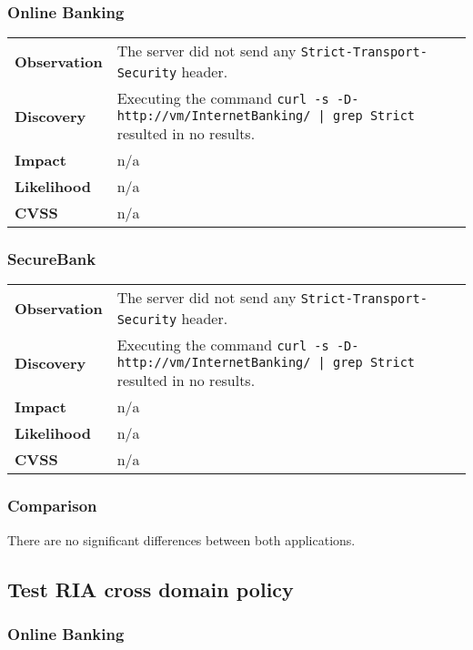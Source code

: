 \subsubsection*{Online Banking}

\begin{tabular}{l|p{10cm}}

\textbf{Observation} & The server did not send any \texttt{Strict-Transport-Security} header.  \\
\textbf{Discovery} & Executing the command \texttt{curl -s -D- http://vm/InternetBanking/ | grep Strict} resulted in no results. \\
\textbf{Impact} & n/a \\
\textbf{Likelihood} & n/a \\
\textbf{CVSS} & n/a \\
\end{tabular}


\subsubsection*{SecureBank}

\begin{tabular}{l|p{10cm}}

\textbf{Observation} & The server did not send any \texttt{Strict-Transport-Security} header.  \\
\textbf{Discovery} & Executing the command \texttt{curl -s -D- http://vm/InternetBanking/ | grep Strict} resulted in no results. \\
\textbf{Impact} & n/a \\
\textbf{Likelihood} & n/a \\
\textbf{CVSS} & n/a \\
\end{tabular}

\subsubsection*{Comparison}
There are no significant differences between both applications.

\clearpage
\subsection{Test RIA cross domain policy}

\subsubsection*{Online Banking}

